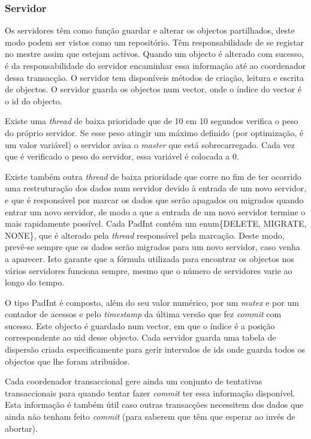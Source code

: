 \subsubsection{Servidor}

Os servidores têm como função guardar e alterar os objectos partilhados, deste modo podem ser vistos como um repositório. Têm responsabilidade de se registar no mestre assim que estejam activos. Quando um objecto é alterado com sucesso, é da responsabilidade do servidor encaminhar essa informação até ao coordenador dessa transacção. O servidor tem disponíveis métodos de criação, leitura e escrita de objectos. O servidor guarda os objectos num vector, onde o índice do vector é o id do objecto. 

Existe uma \textit{thread} de baixa prioridade que de 10 em 10 segundos verifica o peso do próprio servidor. Se esse peso atingir um máximo definido (por optimização, é um valor variável) o servidor avisa o \textit{master} que está sobrecarregado. Cada vez que é verificado o peso do servidor, essa variável é colocada a 0. 

Existe também outra \textit{thread} de baixa prioridade que corre no fim de ter ocorrido uma restruturação dos dados num servidor devido à entrada de um novo servidor, e que é responsável por marcar os dados que serão apagados ou migrados quando entrar um novo servidor, de modo a que a entrada de um novo servidor termine o mais rapidamente possível. Cada PadInt contém um enum\{DELETE, MIGRATE, NONE\}, que é alterado pela \textit{thread} responsável pela marcação. Deste modo, prevê-se sempre que os dados serão migrados para um novo servidor, caso venha a aparecer. Isto garante que a fórmula utilizada para encontrar os objectos nos vários servidores funciona sempre, mesmo que o número de servidores varie ao longo do tempo.

O tipo PadInt é composto, além do seu valor numérico, por um \textit{mutex} e por um contador de acessos e pelo \textit{timestamp} da última versão que fez \textit{commit} com sucesso. Este objecto é guardado num vector, em que o índice é a posição correspondente ao uid desse objecto. Cada servidor guarda uma tabela de dispersão criada especificamente para gerir intervalos de ids onde guarda todos os objectos que lhe foram atribuídos.

Cada coordenador transaccional gere ainda um conjunto de tentativas transaccionais para quando tentar fazer \textit{commit} ter essa informação disponível. Esta informação é também útil caso outras transacções necessitem dos dados que ainda não tenham feito \textit{commit} (para saberem que têm que esperar ao invés de abortar). 


